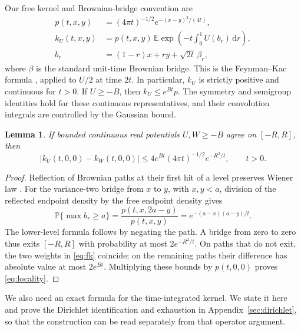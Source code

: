 \documentclass[11pt,a4paper]{article}
\newtheorem{lemma}[theorem]{Lemma}
\newcommand{\dd}{\,\mathrm d}
\begin{document}
Our free kernel and Brownian-bridge convention are
\begin{equation}\label{eq:fk}
 \begin{split}
 p(t,x,y)&=(4\pi t)^{-1/2}e^{-(x-y)^2/(4t)},\\
 k_U(t,x,y)&=p(t,x,y)\,
  \mathbb E\exp\left(-t\int_0^1 U(b_r)\dd r\right),\\
 b_r&=(1-r)x+ry+\sqrt{2t}\,\beta_r,
 \end{split}
\end{equation}
where $\beta$ is the standard unit-time Brownian bridge. This is the
Feynman--Kac formula \cite[Theorem 1.1]{Simon}, applied to $U/2$ at time
$2t$. In particular, $k_U$ is strictly positive and continuous for $t>0$.
If $U\geq-B$, then $k_U\leq e^{Bt}p$. The symmetry and semigroup identities
hold for these continuous representatives, and their convolution integrals
are controlled by the Gaussian bound.

\begin{lemma}\label{lem:locality}
If bounded continuous real potentials $U,W\geq-B$ agree on $[-R,R]$, then
\begin{equation}\label{eq:locality}
 |k_U(t,0,0)-k_W(t,0,0)|
 \leq 4e^{Bt}(4\pi t)^{-1/2}e^{-R^2/t},\qquad t>0.
\end{equation}
\end{lemma}
\begin{proof}
Reflection of Brownian paths at their first hit of a level preserves Wiener
law \cite[Proposition 4]{Lalley}. For the variance-two bridge from $x$ to
$y$, with $x,y<a$, division of the reflected endpoint density by the free
endpoint density gives
\begin{equation}\label{eq:reflection}
 \mathbb P\{\max b_r\geq a\}
   =\frac{p(t,x,2a-y)}{p(t,x,y)}
   =e^{-(a-x)(a-y)/t}.
\end{equation}
The lower-level formula follows by negating the path. A bridge from zero to
zero thus exits $[-R,R]$ with probability at most $2e^{-R^2/t}$. On paths
that do not exit, the two weights in \eqref{eq:fk} coincide; on the remaining
paths their difference has absolute value at most $2e^{Bt}$. Multiplying
these bounds by $p(t,0,0)$ proves \eqref{eq:locality}.
\end{proof}

We also need an exact formula for the time-integrated kernel. We state it
here and prove the Dirichlet identification and exhaustion in
Appendix~\ref{sec:dirichlet}, so that the construction can be read separately
from that operator argument.
\end{document}
